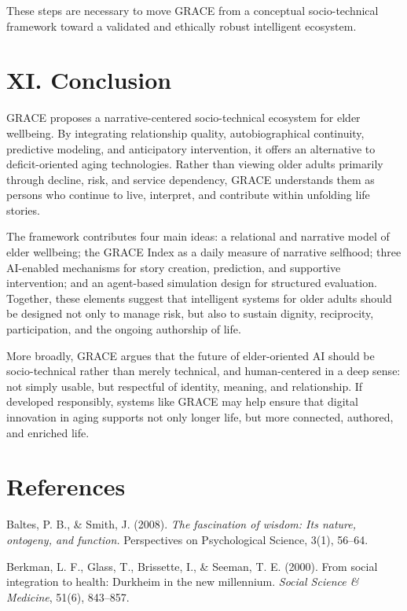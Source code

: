 \documentclass[
  journal,
]{IEEEtran}%
\begin{document}
These steps are necessary to move GRACE from a conceptual
socio-technical framework toward a validated and ethically robust
intelligent ecosystem.

\section{XI. Conclusion}\label{xi.-conclusion}

GRACE proposes a narrative-centered socio-technical ecosystem for elder
wellbeing. By integrating relationship quality, autobiographical
continuity, predictive modeling, and anticipatory intervention, it
offers an alternative to deficit-oriented aging technologies. Rather
than viewing older adults primarily through decline, risk, and service
dependency, GRACE understands them as persons who continue to live,
interpret, and contribute within unfolding life stories.

The framework contributes four main ideas: a relational and narrative
model of elder wellbeing; the GRACE Index as a daily measure of
narrative selfhood; three AI-enabled mechanisms for story creation,
prediction, and supportive intervention; and an agent-based simulation
design for structured evaluation. Together, these elements suggest that
intelligent systems for older adults should be designed not only to
manage risk, but also to sustain dignity, reciprocity, participation,
and the ongoing authorship of life.

More broadly, GRACE argues that the future of elder-oriented AI should
be socio-technical rather than merely technical, and human-centered in a
deep sense: not simply usable, but respectful of identity, meaning, and
relationship. If developed responsibly, systems like GRACE may help
ensure that digital innovation in aging supports not only longer life,
but more connected, authored, and enriched life.

\section{References}\label{references}

Baltes, P. B., \& Smith, J. (2008). \emph{The fascination of wisdom: Its
nature, ontogeny, and function.} Perspectives on Psychological Science,
3(1), 56--64.

Berkman, L. F., Glass, T., Brissette, I., \& Seeman, T. E. (2000). From
social integration to health: Durkheim in the new millennium.
\emph{Social Science \& Medicine}, 51(6), 843--857.
\end{document}
